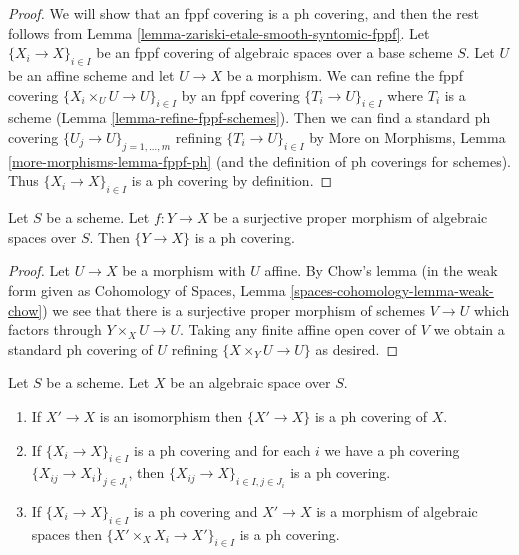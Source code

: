 \begin{proof}
We will show that an fppf covering is a ph covering, and then the
rest follows from Lemma \ref{lemma-zariski-etale-smooth-syntomic-fppf}.
Let $\{X_i \to X\}_{i \in I}$ be an fppf covering of algebraic spaces
over a base scheme $S$. Let $U$ be an affine scheme and let
$U \to X$ be a morphism. We can refine the fppf covering
$\{X_i \times_U U \to U\}_{i \in I}$ by an fppf covering
$\{T_i \to U\}_{i \in I}$ where $T_i$ is a scheme
(Lemma \ref{lemma-refine-fppf-schemes}).
Then we can find a standard ph covering $\{U_j \to U\}_{j = 1, \ldots, m}$
refining $\{T_i \to U\}_{i \in I}$ by
More on Morphisms, Lemma \ref{more-morphisms-lemma-fppf-ph}
(and the definition of ph coverings for schemes).
Thus $\{X_i \to X\}_{i \in I}$ is a ph covering by definition.
\end{proof}

\begin{lemma}
\label{lemma-surjective-proper-ph}
Let $S$ be a scheme. Let $f : Y \to X$ be a surjective proper morphism
of algebraic spaces over $S$. Then $\{Y \to X\}$ is a ph covering.
\end{lemma}

\begin{proof}
Let $U \to X$ be a morphism with $U$ affine.
By Chow's lemma (in the weak form given as
Cohomology of Spaces, Lemma \ref{spaces-cohomology-lemma-weak-chow})
we see that there is a surjective proper morphism of schemes
$V \to U$ which factors through $Y \times_X U \to U$.
Taking any finite affine open cover of $V$ we obtain a
standard ph covering of $U$ refining $\{X \times_Y U \to U\}$
as desired.
\end{proof}

\begin{lemma}
\label{lemma-ph}
Let $S$ be a scheme. Let $X$ be an algebraic space over $S$.
\begin{enumerate}
\item If $X' \to X$ is an isomorphism then $\{X' \to X\}$
is a ph covering of $X$.
\item If $\{X_i \to X\}_{i\in I}$ is a ph covering and for each
$i$ we have a ph covering $\{X_{ij} \to X_i\}_{j\in J_i}$, then
$\{X_{ij} \to X\}_{i \in I, j\in J_i}$ is a ph covering.
\item If $\{X_i \to X\}_{i\in I}$ is a ph covering
and $X' \to X$ is a morphism of algebraic spaces then
$\{X' \times_X X_i \to X'\}_{i\in I}$ is a ph covering.
\end{enumerate}
\end{lemma}

